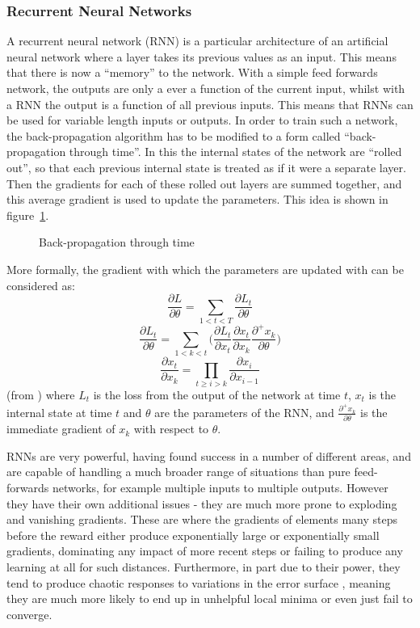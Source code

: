 \subsubsection{Recurrent Neural Networks}

A recurrent neural network (RNN) is a particular architecture of an artificial neural network where a layer takes its previous values as an input. This means that there is now a ``memory'' to the network. With a simple feed forwards network, the outputs are only a ever a function of the current input, whilst with a RNN the output is a function of all previous inputs. This means that RNNs can be used for variable length inputs or outputs. In order to train such a network, the back-propagation algorithm has to be modified to a form called ``back-propagation through time''. In this the internal states of the network are ``rolled out'', so that each previous internal state is treated as if it were a separate layer. Then the gradients for each of these rolled out layers are summed together, and this average gradient is used to update the parameters. This idea is shown in figure~\ref{fig:bptt}.

\begin{figure}
\centering

\caption{Back-propagation through time}
\label{fig:bptt}
\end{figure}
More formally, the gradient with which the parameters are updated with can be considered as:
\begin{equation}
\frac{\partial L}{\partial \theta} = \sum_{1<t<T}\frac{\partial L_t}{\partial\theta}
\end{equation}
\begin{equation}
\frac{\partial L_t}{\partial\theta} = \sum_{1 < k< t} \big( \frac{\partial L_t}{\partial x_t}\frac{\partial x_t}{\partial x_k} \frac{\partial^+ x_k}{\partial\theta} \big)
\end{equation}
\begin{equation}
\frac{\partial x_t}{\partial x_k} =\prod_{t \geq i > k} \frac{\partial x_i}{\partial x_{i-1}} 
\end{equation}
 (from \cite{pascanu2012difficulty}) where $L_t$ is the loss from the output of the network at time $t$, $x_t$ is the internal state at time $t$ and $\theta$ are the parameters of the RNN, and $\frac{\partial^+ x_k}{\partial\theta}$ is the immediate gradient of $x_k$ with respect to $\theta$. 
 
RNNs are very powerful, having found success in a number of different areas, and are capable of handling a much broader range of situations than pure feed-forwards networks, for example multiple inputs to multiple outputs. However they have their own additional issues - they are much more prone to exploding and vanishing gradients. These are where the gradients of elements many steps before the reward either produce exponentially large or exponentially small gradients, dominating any impact of more recent steps or failing to produce any learning at all for such distances. Furthermore, in part due to their power, they tend to produce chaotic responses to variations in the error surface \cite{pascanu2012difficulty}, meaning they are much more likely to end up in unhelpful local minima or even just fail to converge.

